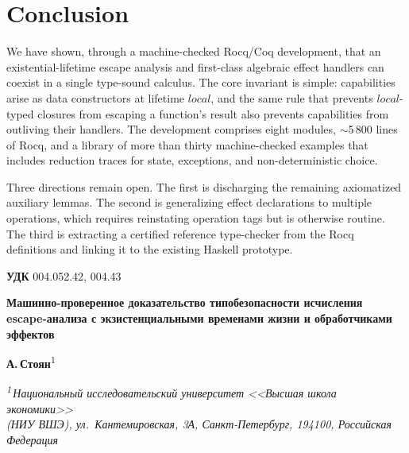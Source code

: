 \documentclass[12pt,a4paper]{article}
\begin{document}
    \section{Conclusion} \label{sec:conclusion}

    We have shown, through a machine-checked Rocq/Coq development, that an
    existential-lifetime escape analysis and first-class algebraic effect
    handlers can coexist in a single type-sound calculus.
    The core invariant is simple: capabilities arise as data constructors at
    lifetime $local$, and the same rule that prevents $local$-typed closures
    from escaping a function's result also prevents capabilities from outliving
    their handlers.
    The development comprises eight modules, $\sim$5\,800 lines of Rocq, and a
    library of more than thirty machine-checked examples that includes reduction
    traces for state, exceptions, and non-deterministic choice.

    Three directions remain open.
    The first is discharging the remaining axiomatized auxiliary lemmas.
    The second is generalizing effect declarations to multiple operations, which
    requires reinstating operation tags but is otherwise routine.
    The third is extracting a certified reference type-checker from the Rocq
    definitions and linking it to the existing Haskell prototype.


    
    


    \vspace{1.5em}
    \noindent\textbf{УДК} 004.052.42, 004.43

    \vspace{0.5em}
    \begin{center}
        {\large\bfseries
            Машинно-проверенное доказательство типобезопасности исчисления
            escape-анализа с экзистенциальными временами жизни и обработчиками эффектов\par}

        \vspace{0.6em}
        {\normalsize\textbf{А.\,Стоян}\textsuperscript{1}\par}

        \vspace{0.4em}
        {\small\itshape
            \textsuperscript{1}\,Национальный исследовательский университет <<Высшая школа экономики>>\\
            (НИУ ВШЭ), ул.~Кантемировская, 3А, Санкт-Петербург, 194100, Российская Федерация\par}
    \end{center}
\end{document}
